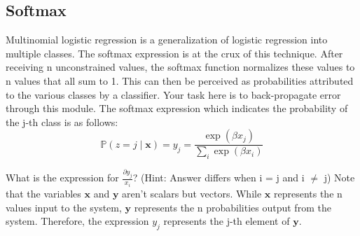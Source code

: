 \documentclass[11pt]{article}
\newcommand{\0}{\mat{0}}
\newcommand{\vect}[1]{\bm{#1}}     %
\begin{document}
\subsection{Softmax}
Multinomial logistic regression is a generalization of logistic regression into multiple classes. The softmax expression is at the crux of this technique. After receiving n unconstrained values, the softmax function normalizes these values to n values that all sum to 1. This can then be perceived as probabilities attributed to the various classes by a classifier. Your task here is to back-propagate error through this module. The softmax expression which indicates the probability of the j-th class is as follows:
\[
	\mathbb{P}(z = j \; | \; \vect{x} ) = y_j = \frac{\exp(\beta x_j)}{\sum_i \exp(\beta x_i)}
\]

What is the expression for  $\frac{\partial y_j}{x_i}$? (Hint: Answer differs when i = j and i $\ne$ j)
Note that the variables $\vect{x}$ and $\vect{y}$ aren’t scalars but vectors. 
While $\vect{x}$ represents the n values input to the system,  $\vect{y}$ represents the n probabilities output from the system. Therefore, the expression $y_j$ represents the j-th element of $\vect{y}$.
\end{document}
